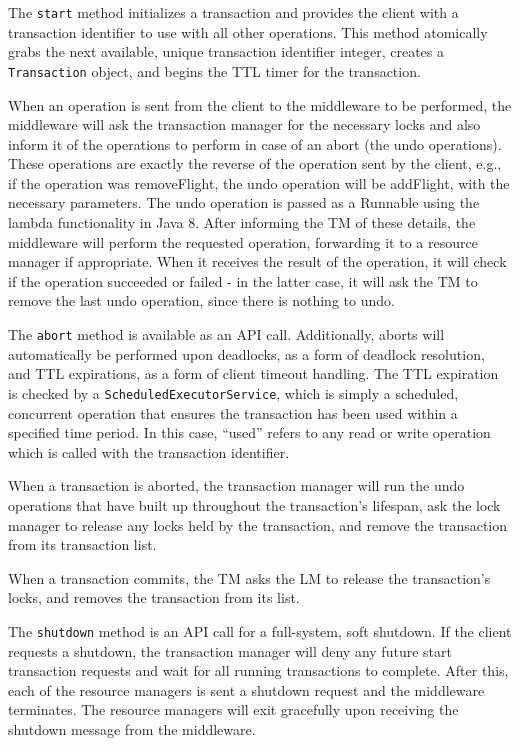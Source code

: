 \documentclass[11pt]{article}
\begin{document}
The \texttt{start} method initializes a transaction and provides the client with a transaction identifier to use with all other operations. This method atomically grabs the next available, unique transaction identifier integer, creates a \texttt{Transaction} object, and begins the TTL timer for the transaction. \par

When an operation is sent from the client to the middleware to be performed, the middleware will ask the transaction manager for the necessary locks and also inform it of the operations to perform in case of an abort (the undo operations). These operations are exactly the reverse of the operation sent by the client, e.g., if the operation was removeFlight, the undo operation will be addFlight, with the necessary parameters. The undo operation is passed as a Runnable using the lambda functionality in Java 8. After informing the TM of these details, the middleware will perform the requested operation, forwarding it to a resource manager if appropriate. When it receives the result of the operation, it will check if the operation succeeded or failed - in the latter case, it will ask the TM to remove the last undo operation, since there is nothing to undo. \par

The \texttt{abort} method is available as an API call. Additionally, aborts will automatically be performed upon deadlocks, as a form of deadlock resolution, and TTL expirations, as a form of client timeout handling. The TTL expiration is checked by a \texttt{ScheduledExecutorService}, which is simply a scheduled, concurrent operation that ensures the transaction has been used within a specified time period. In this case, ``used'' refers to any read or write operation which is called with the transaction identifier.  \par

When a transaction is aborted, the transaction manager will run the undo operations that have built up throughout the transaction's lifespan, ask the lock manager to release any locks held by the transaction, and remove the transaction from its transaction list. \par

When a transaction commits, the TM asks the LM to release the transaction's locks, and removes the transaction from its list. \par

The \texttt{shutdown} method is an API call for a full-system, soft shutdown. If the client requests a shutdown, the transaction manager will deny any future start transaction requests and wait for all running transactions to complete. After this, each of the resource managers is sent a shutdown request and the middleware terminates. The resource managers will exit gracefully upon receiving the shutdown message from the middleware. \par
\end{document}
